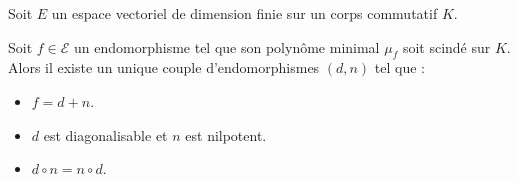 


	
	
	
	Soit $E$ un espace vectoriel de dimension finie sur un corps commutatif $K$.
	
	\begin{theorem}
		Soit $f \in \mathcal{E}$ un endomorphisme tel que son polynôme minimal $\mu_f$ soit scindé sur $K$. Alors il existe un unique couple d'endomorphismes $(d, n)$ tel que :
		\begin{itemize}
			\item $f = d + n$.
			\item $d$ est diagonalisable et $n$ est nilpotent.
			\item $d \circ n = n \circ d$.
		\end{itemize}
	\end{theorem}
	
